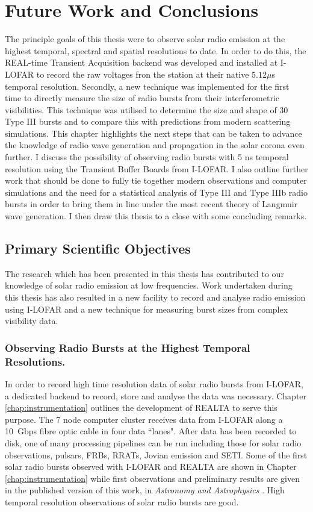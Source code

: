 \doublespacing
\chapter{Future Work and Conclusions}
\label{chap:future}
The principle goals of this thesis were to observe solar radio emission at the highest temporal, spectral and spatial resolutions to date. In order to do this, the REAL-time Transient Acquisition backend was developed and installed at I-LOFAR to record the raw voltages fron the station at their native $5.12 \mu$s temporal resolution.
Secondly, a new technique was implemented for the first time to directly measure the size of radio bursts from their interferometric visibilities. This technique was utilised to determine the size and shape of 30 Type III bursts and to compare this with predictions from modern scattering simulations.
This chapter highlights the next steps that can be taken to advance the knowledge of radio wave generation and propagation in the solar corona even further. I discuss the possibility of observing radio bursts with 5 ns temporal resolution using the Transient Buffer Boards from I-LOFAR. I also outline further work that should be done to fully tie together modern observations and computer simulations and the need for a statistical analysis of Type III and Type IIIb radio bursts in order to bring them in line under the most recent theory of Langmuir wave generation. I then draw this thesis to a close with some concluding remarks.

\section{Primary Scientific Objectives}
The research which has been presented in this thesis has contributed to our knowledge of solar radio emission at low frequencies. Work undertaken during this thesis has also resulted in a new facility to record and analyse radio emission using I-LOFAR and a new technique for measuring burst sizes from complex visibility data.

\subsection{Observing Radio Bursts at the Highest Temporal Resolutions.}
In order to record high time resolution data of solar radio bursts from I-LOFAR, a dedicated backend to record, store and analyse the data was necessary. Chapter \ref{chap:instrumentation} outlines the development of REALTA to serve this purpose. The 7 node computer cluster receives data from I-LOFAR along a 10~Gbps fibre optic cable in four data ``lanes". After data has been recorded to disk, one of many processing pipelines can be run including those for solar radio observations, pulsars, FRBs, RRATs, Jovian emission and SETI. Some of the first solar radio bursts observed with I-LOFAR and REALTA are shown in Chapter \ref{chap:instrumentation} while first observations and preliminary results are given in the published version of this work, in \textit{Astronomy and Astrophysics} \citep{Murphy2021b}. High temporal resolution observations of solar radio bursts are good. \cite{Morosan2015, Clarke2019}

